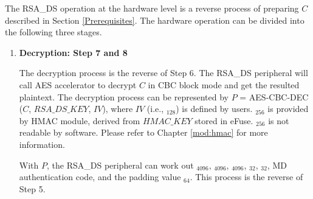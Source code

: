 \documentclass[main\_\_EN.tex]{subfiles}
\begin{document}
The RSA\_DS operation at the hardware level is a reverse process of preparing \begin{math}C\end{math} described in Section \ref{Prerequisites}. The hardware operation can be divided into the following three stages.
\begin{enumerate}

    \item {\bfseries Decryption: Step 7 and 8}

        The decryption process is the reverse of Step 6.
        The RSA\_DS peripheral will call AES accelerator to decrypt \begin{math}C\end{math} in CBC block mode and get the resulted plaintext. The decryption process can be represented by \begin{math}P\end{math} = AES-CBC-DEC (\begin{math}C\end{math}, \begin{math}RSA\_DS\_KEY\end{math}, \begin{math}IV\end{math}), where \begin{math}IV\end{math} (i.e., \begin{math}[IV]_{128}\end{math}) is defined by users. \begin{math}[RSA\_DS\_KEY]_{256}\end{math} is provided by HMAC module, derived from \begin{math}HMAC\_KEY\end{math} stored in eFuse. \begin{math}[RSA\_DS\_KEY]_{256}\end{math} is not readable by software. Please refer to Chapter \ref{mod:hmac} \textit{} for more information.

        With \begin{math}P\end{math}, the RSA\_DS peripheral can work out \begin{math}[Y]_{4096}\end{math},
            \begin{math}[M]_{4096}\end{math},
            \begin{math}[\overline{r}]_{4096}\end{math},
            \begin{math}[M^{\prime}]_{32}\end{math},
            \begin{math}[L]_{32}\end{math},
            MD authentication code, and the padding value \begin{math}[\beta]_{64} \end{math}. This process is the reverse of Step 5.


\end{enumerate}
\end{document}
